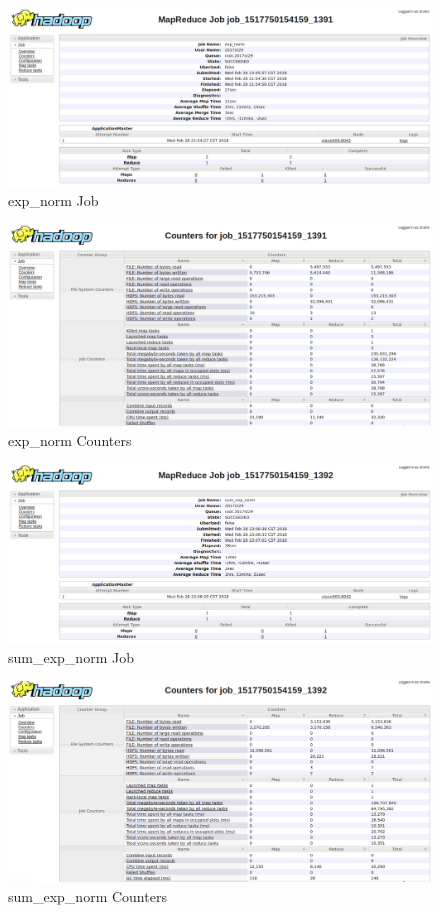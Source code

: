 \documentclass[a4paper,UTF8]{article}
\theoremstyle{definition}
\begin{document}
\begin{figure}[H]
	\centering
	\includegraphics[width=\textwidth]{pic/391_exp_norm_job.png}
	\caption{exp\_norm Job}
\end{figure}
\begin{figure}[H]
	\centering
	\includegraphics[width=\textwidth]{pic/391_exp_norm_counters.png}
	\caption{exp\_norm Counters}
\end{figure}

\begin{figure}[H]
	\centering
	\includegraphics[width=\textwidth]{pic/392_sum_exp_norm_job.png}
	\caption{sum\_exp\_norm Job}
\end{figure}
\begin{figure}[H]
	\centering
	\includegraphics[width=\textwidth]{pic/392_sum_exp_norm_counters.png}
	\caption{sum\_exp\_norm Counters}
\end{figure}
\end{document}
